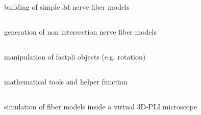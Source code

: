 \subsection{}
building of simple 3d nerve fiber models
\subsection{}
generation of non intersection nerve fiber models
\subsection{}
manipulation of fastpli objects (e.g. rotation)
\subsection{}
mathematical tools and helper function
\subsection{}
simulation of fiber models inside a virtual 3D-PLI microscope
% 







